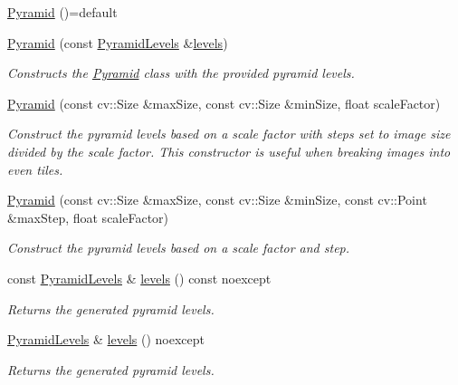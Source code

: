 \begin{DoxyCompactItemize}
\item 
\hyperlink{classdg_1_1deepcore_1_1imagery_1_1_pyramid_a2d3f920bc3973c97a029135f03974ab1}{Pyramid} ()=default
\item 
\hyperlink{group___imagery_module_ga5133c51d0c8c7ca698287d5d4dd61986}{Pyramid} (const \hyperlink{namespacedg_1_1deepcore_1_1imagery_a19b24d2d9a7e8c5b4ab65d1fa42b8b20}{Pyramid\+Levels} \&\hyperlink{group___imagery_module_ga91d47b866ba5242dd28833d4c7607b1b}{levels})
\begin{DoxyCompactList}\small\item\em Constructs the \hyperlink{classdg_1_1deepcore_1_1imagery_1_1_pyramid}{Pyramid} class with the provided pyramid levels. \end{DoxyCompactList}\item 
\hyperlink{group___imagery_module_ga0d97d66a5c60146ee198f282e3633778}{Pyramid} (const cv\+::\+Size \&max\+Size, const cv\+::\+Size \&min\+Size, float scale\+Factor)
\begin{DoxyCompactList}\small\item\em Construct the pyramid levels based on a scale factor with steps set to image size divided by the scale factor. This constructor is useful when breaking images into even tiles. \end{DoxyCompactList}\item 
\hyperlink{group___imagery_module_ga92c5dda62793cc05a2fe10b8c85c7e65}{Pyramid} (const cv\+::\+Size \&max\+Size, const cv\+::\+Size \&min\+Size, const cv\+::\+Point \&max\+Step, float scale\+Factor)
\begin{DoxyCompactList}\small\item\em Construct the pyramid levels based on a scale factor and step. \end{DoxyCompactList}\item 
const \hyperlink{namespacedg_1_1deepcore_1_1imagery_a19b24d2d9a7e8c5b4ab65d1fa42b8b20}{Pyramid\+Levels} \& \hyperlink{group___imagery_module_ga91d47b866ba5242dd28833d4c7607b1b}{levels} () const noexcept
\begin{DoxyCompactList}\small\item\em Returns the generated pyramid levels. \end{DoxyCompactList}\item 
\hyperlink{namespacedg_1_1deepcore_1_1imagery_a19b24d2d9a7e8c5b4ab65d1fa42b8b20}{Pyramid\+Levels} \& \hyperlink{group___imagery_module_gacabef885d8fcdf548631bcf134e17298}{levels} () noexcept
\begin{DoxyCompactList}\small\item\em Returns the generated pyramid levels. \end{DoxyCompactList}\end{DoxyCompactItemize}


